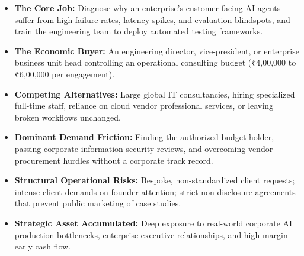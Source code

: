 \begin{itemize}[leftmargin=12pt,itemsep=1pt,topsep=1pt]
  \item \textbf{The Core Job:} Diagnose why an enterprise's customer-facing AI agents suffer from high failure rates, latency spikes, and evaluation blindspots, and train the engineering team to deploy automated testing frameworks.
  \item \textbf{The Economic Buyer:} An engineering director, vice-president, or enterprise business unit head controlling an operational consulting budget (₹4,00,000 to ₹6,00,000 per engagement).
  \item \textbf{Competing Alternatives:} Large global IT consultancies, hiring specialized full-time staff, reliance on cloud vendor professional services, or leaving broken workflows unchanged.
  \item \textbf{Dominant Demand Friction:} Finding the authorized budget holder, passing corporate information security reviews, and overcoming vendor procurement hurdles without a corporate track record.
  \item \textbf{Structural Operational Risks:} Bespoke, non-standardized client requests; intense client demands on founder attention; strict non-disclosure agreements that prevent public marketing of case studies.
  \item \textbf{Strategic Asset Accumulated:} Deep exposure to real-world corporate AI production bottlenecks, enterprise executive relationships, and high-margin early cash flow.
\end{itemize}
